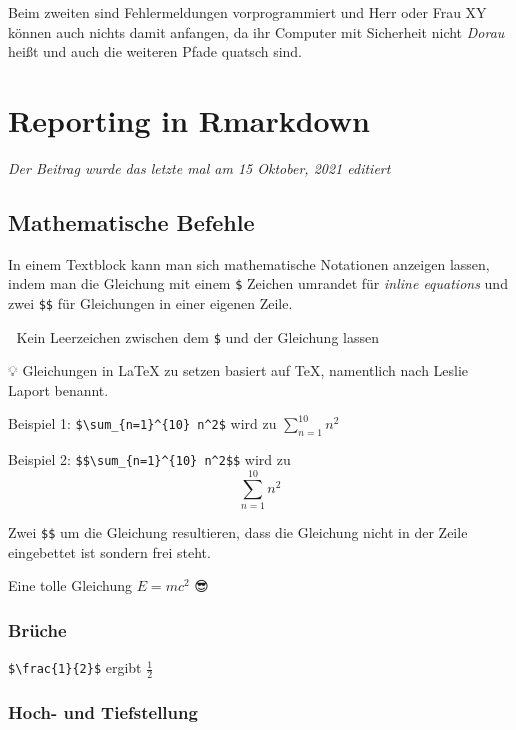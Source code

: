 \documentclass[
]{article}
\begin{document}
Beim zweiten sind Fehlermeldungen vorprogrammiert und Herr oder Frau XY können auch nichts damit anfangen, da ihr Computer mit Sicherheit nicht \emph{Dorau} heißt und auch die weiteren Pfade quatsch sind.

\hypertarget{reporting-in-rmarkdown}{%
\section{Reporting in Rmarkdown}\label{reporting-in-rmarkdown}}

\emph{Der Beitrag wurde das letzte mal am 15 Oktober, 2021 editiert}

\hypertarget{mathematische-befehle}{%
\subsection{Mathematische Befehle}\label{mathematische-befehle}}

In einem Textblock kann man sich mathematische Notationen anzeigen lassen, indem man die Gleichung mit einem \texttt{\$} Zeichen umrandet für \emph{inline equations} und zwei \texttt{\$\$} für Gleichungen in einer eigenen Zeile.

🚨 Kein Leerzeichen zwischen dem \texttt{\$} und der Gleichung lassen

💡 Gleichungen in LaTeX zu setzen basiert auf TeX, namentlich nach Leslie Laport benannt.

Beispiel 1: \texttt{\$\textbackslash{}sum\_\{n=1\}\^{}\{10\}\ n\^{}2\$} wird zu \(\sum_{n=1}^{10} n^2\)

Beispiel 2: \texttt{\$\$\textbackslash{}sum\_\{n=1\}\^{}\{10\}\ n\^{}2\$\$} wird zu \[\sum_{n=1}^{10} n^2\]

Zwei \texttt{\$\$} um die Gleichung resultieren, dass die Gleichung nicht in der Zeile eingebettet ist sondern frei steht.

Eine tolle Gleichung \(E=mc^2\) 😎

\hypertarget{bruxfcche}{%
\subsubsection{Brüche}\label{bruxfcche}}

\texttt{\$\textbackslash{}frac\{1\}\{2\}\$} ergibt \(\frac{1}{2}\)

\hypertarget{hoch--und-tiefstellung}{%
\subsubsection{Hoch- und Tiefstellung}\label{hoch--und-tiefstellung}}
\end{document}
